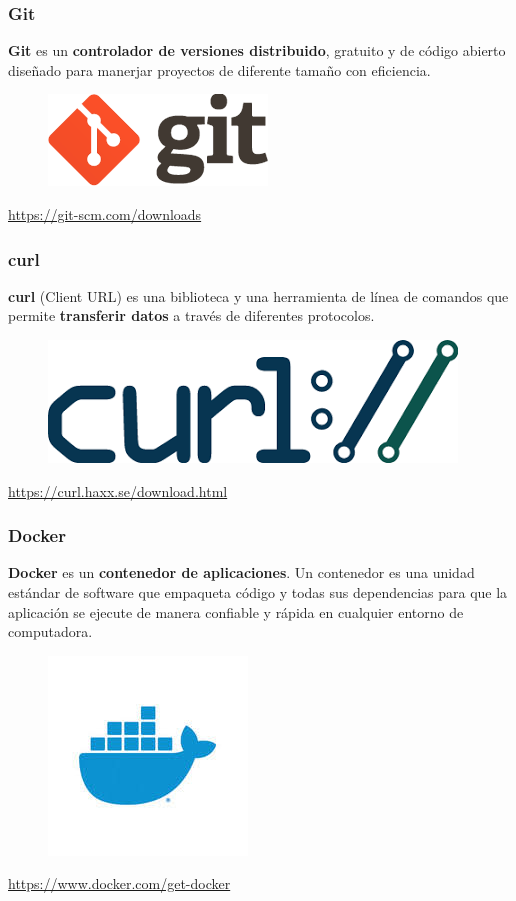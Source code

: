 \documentclass{beamer}
\begin{document}
	\begin{frame}
		\frametitle{Git}
		\textbf{Git} es un \textbf{controlador de versiones distribuido}, gratuito y de código abierto diseñado para manerjar proyectos de diferente tamaño con eficiencia.
		\begin{figure}[h]
			\includegraphics[scale=.3]{git}
			\centering
		\end{figure}
		\begin{center}
			\tiny{\url{https://git-scm.com/downloads}}
		\end{center}
	\end{frame}

	\begin{frame}
		\frametitle{curl}
		\textbf{curl} (Client URL) es una biblioteca y una herramienta de línea de comandos que permite \textbf{transferir datos} a través de diferentes protocolos.
		\begin{figure}[h]
			\includegraphics[scale=.3]{curl}
			\centering
		\end{figure}
		\begin{center}
			\tiny{\url{https://curl.haxx.se/download.html}}
		\end{center}
	\end{frame}

	\begin{frame}
		\frametitle{Docker}
		\textbf{Docker} es un \textbf{contenedor de aplicaciones}. Un contenedor es una unidad estándar de software que empaqueta código y todas sus dependencias para que la aplicación se ejecute de manera confiable y rápida en cualquier entorno de computadora.
		\begin{figure}[h]
			\includegraphics[scale=.3]{docker}
			\centering
		\end{figure}
		\begin{center}
			\tiny{\url{https://www.docker.com/get-docker}}
		\end{center}
	\end{frame}
	
\end{document}
